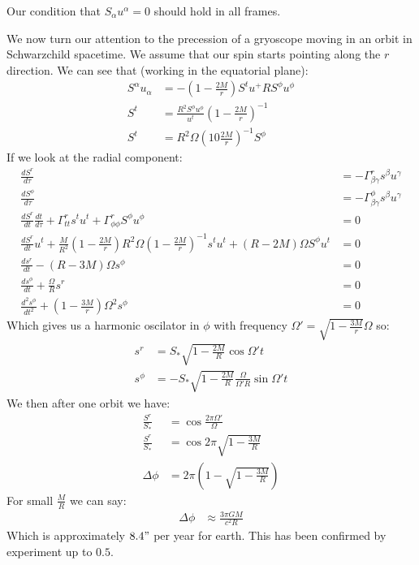 Our condition that $S_\alpha u^\alpha =0$ should hold in all frames.

We now turn our attention to the precession of a gryoscope moving in an orbit in Schwarzchild spacetime. We assume that our spin starts pointing along the $r$ direction. We can see that (working in the equatorial plane):
\begin{align*}
	S^\alpha u_\alpha &= -\left(1- \frac{2M}{r}\right) S^t u^ + R S^\phi u^\phi \\
	S^t &= \frac{R^2 S^\phi u^\phi}{u^t} \left(1 - \frac{2M}{r}\right)^{-1} \\
	S^t &=  R^2 \Omega\left(10\frac{2M}{r}\right)^{-1} S^\phi
\end{align*}
If we look at the radial component:
\begin{align*}
	\frac{dS^r}{d\tau} &= -\Gamma^r_{\beta\gamma} s^\beta u^\gamma \\
	\frac{dS^\phi}{d\tau} &= -\Gamma^\phi_{\beta\gamma} s^\beta u^\gamma \\
	\frac{dS^r}{dt}\frac{dt}{d\tau} + \Gamma^r_{tt} s^t u^t + \Gamma^r_{\phi\phi} S^\phi u^\phi &= 0 \\
	\frac{dS^r}{dt}u^t + \frac{M}{R^2}\left(1- \frac{2M}{r}\right) R^2 \Omega\left(1- \frac{2M}{r}\right)^{-1}  s^t u^t + (R-2M)\Omega S^\phi u^t &= 0 \\
	\frac{ds^r}{dt} - (R-3M)\Omega s^\phi &= 0 \\
	\frac{ds^\phi}{dt} + \frac{\Omega}{R} s^r &= 0 \\
	\frac{d^2 s^\phi}{dt^2} + \left(1-\frac{3M}{r}\right)\Omega^2s^\phi &= 0
\end{align*}
Which gives us a harmonic oscilator in $\phi$ with frequency $\Omega' = \sqrt{1 - \frac{3M}{r}}\Omega$ so:
\begin{align*}
	s^r &= S_* \sqrt{1-\frac{2M}{R}}\cos\Omega' t \\
	s^\phi &= -S_*\sqrt{1-\frac{2M}{R}}\frac{\Omega}{\Omega' R}\sin\Omega' t
\end{align*}
We then after one orbit we have:
\begin{align*}
	\frac{S^r}{S_*} &= \cos \frac{2\pi \Omega'}{\Omega} \\
	\frac{S^r}{S_*} &= \cos 2\pi\sqrt{1-\frac{3M}{R}} \\
	\Delta\phi &= 2\pi \left(1-\sqrt{1-\frac{3M}{R}}\right)
\end{align*}
For small $\frac{M}{R}$ we can say:
\begin{align*}
	\Delta\phi &\approx \frac{3\pi GM}{c^2 R}
\end{align*}
Which is approximately $8.4"$ per year for earth. This has been confirmed by experiment up to $0.5$.

